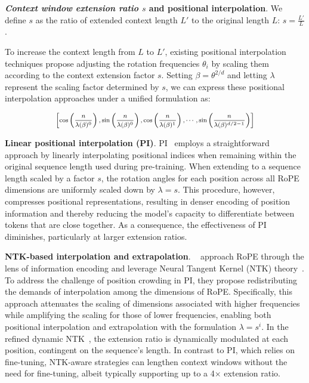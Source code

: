 \textbf{\emph{Context window extension ratio $s$} and positional interpolation}. We define $s$ as  the ratio of extended context length $L'$ to the original length $L$: $s=\frac{L'}{L}$. 

To increase the context length from $L$ to $L'$, existing positional interpolation techniques propose adjusting the rotation frequencies $\theta_i$ by scaling them according to the context extension factor $s$. Setting $\beta = \theta^{2/d}$ and letting $\lambda$ represent the scaling factor determined by $s$, we can express these positional interpolation approaches under a unified formulation as:

\begin{equation}	
	\fontsize{7.5}{7.5} \selectfont
	\label{eq:unified_rope}
	\begin{aligned}
		\left[\cos\left(\frac{n}{\lambda(\beta)^0}\right), \sin\left(\frac{n}{\lambda(\beta)^0}\right), \cos\left(\frac{n}{\lambda(\beta)^1}\right), \cdots, \sin\left(\frac{n}{\lambda(\beta)^{d/2-1}}\right)\right]
	\end{aligned}
\end{equation}

\textbf{Linear positional interpolation (PI)}. PI~\cite{pi} employs a straightforward approach by linearly interpolating positional indices when remaining within the original sequence length used during pre-training. When extending to a sequence length scaled by a factor $s$, the rotation angles for each position across all RoPE dimensions are uniformly scaled down by $\lambda=s$. This procedure, however, compresses positional representations, resulting in denser encoding of position information and thereby reducing the model’s capacity to differentiate between tokens that are close together. As a consequence, the effectiveness of PI diminishes, particularly at larger extension ratios.

\textbf{NTK-based interpolation and extrapolation}. ~\cite{ntk,dynamicntk} approach RoPE through the lens of information encoding and leverage Neural Tangent Kernel (NTK) theory~\cite{jacot2018neural,tancik2020fourier}. To address the challenge of position crowding in PI, they propose redistributing the demands of interpolation among the dimensions of RoPE. Specifically, this approach attenuates the scaling of dimensions associated with higher frequencies while amplifying the scaling for those of lower frequencies, enabling both positional interpolation and extrapolation with the formulation $\lambda=s^{i}$. In the refined dynamic NTK~\cite{dynamicntk}, the extension ratio is dynamically modulated at each position, contingent on the sequence’s length. In contrast to PI, which relies on fine-tuning, NTK-aware strategies can lengthen context windows without the need for fine-tuning, albeit typically supporting up to a 4$\times$ extension ratio.

